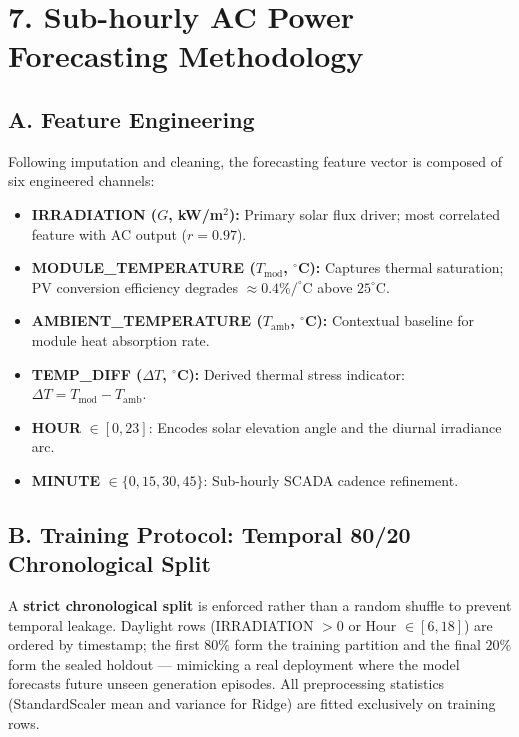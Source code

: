 \documentclass[10pt,a4paper]{article}
\begin{document}
\clearpage


\section*{7. Sub-hourly AC Power Forecasting Methodology}

\subsection*{A. Feature Engineering}
Following imputation and cleaning, the forecasting feature vector is composed of six engineered channels:
\begin{itemize}[leftmargin=14pt,itemsep=1.5pt,topsep=2pt,parsep=0pt]
    \item \textbf{IRRADIATION ($G$, kW/m$^2$):} Primary solar flux driver; most correlated feature with AC output ($r = 0.97$).
    \item \textbf{MODULE\_TEMPERATURE ($T_{\text{mod}}$, $^\circ$C):} Captures thermal saturation; PV conversion efficiency degrades $\approx 0.4\%/^\circ$C above $25^\circ$C.
    \item \textbf{AMBIENT\_TEMPERATURE ($T_{\text{amb}}$, $^\circ$C):} Contextual baseline for module heat absorption rate.
    \item \textbf{TEMP\_DIFF ($\Delta T$, $^\circ$C):} Derived thermal stress indicator: $\Delta T = T_{\text{mod}} - T_{\text{amb}}$.
    \item \textbf{HOUR} $\in [0, 23]$: Encodes solar elevation angle and the diurnal irradiance arc.
    \item \textbf{MINUTE} $\in \{0, 15, 30, 45\}$: Sub-hourly SCADA cadence refinement.
\end{itemize}

\subsection*{B. Training Protocol: Temporal 80/20 Chronological Split}
A \textbf{strict chronological split} is enforced rather than a random shuffle to prevent temporal leakage. Daylight rows (IRRADIATION $> 0$ or Hour $\in [6, 18]$) are ordered by timestamp; the first $80\%$ form the training partition and the final $20\%$ form the sealed holdout — mimicking a real deployment where the model forecasts future unseen generation episodes. All preprocessing statistics (StandardScaler mean and variance for Ridge) are fitted exclusively on training rows.
\end{document}
